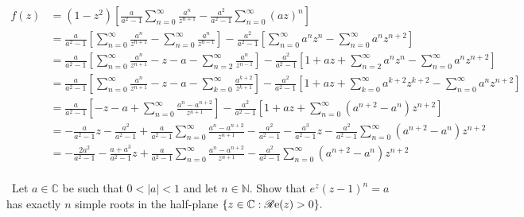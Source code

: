 \documentclass[12pt]{Qual}
\begin{document}
\begin{solution}
\begin{align*}
    f(z)&=(1-z^2)\left[\frac{a}{a^2-1}\sum_{n=0}^\infty\frac{a^n}{z^{n+1}}-\frac{a^2}{a^2-1}\sum_{n=0}^\infty(az)^n\right]\\
    &=\frac{a}{a^2-1}\left[\sum_{n=0}^\infty\frac{a^n}{z^{n+1}}-\sum_{n=0}^\infty\frac{a^n}{z^{n-1}}\right]-\frac{a^2}{a^2-1}\left[\sum_{n=0}^\infty a^nz^n-\sum_{n=0}^\infty a^nz^{n+2}\right]\\
    &=\frac{a}{a^2-1}\left[\sum_{n=0}^\infty\frac{a^n}{z^{n+1}}-z-a-\sum_{n=2}^\infty\frac{a^n}{z^{n-1}}\right]-\frac{a^2}{a^2-1}\left[1+az+\sum_{n=2}^\infty a^nz^n-\sum_{n=0}^\infty a^nz^{n+2}\right]\\
    &=\frac{a}{a^2-1}\left[\sum_{n=0}^\infty\frac{a^n}{z^{n+1}}-z-a-\sum_{k=0}^\infty\frac{a^{k+2}}{z^{k+1}}\right]-\frac{a^2}{a^2-1}\left[1+az+\sum_{k=0}^\infty a^{k+2}z^{k+2}-\sum_{n=0}^\infty a^nz^{n+2}\right]\\
    &=\frac{a}{a^2-1}\left[-z-a+\sum_{n=0}^\infty\frac{a^n-a^{n+2}}{z^{n+1}}\right]-\frac{a^2}{a^2-1}\left[1+az+\sum_{n=0}^\infty (a^{n+2}-a^n)z^{n+2}\right]\\
    &=-\frac{a}{a^2-1}z-\frac{a^2}{a^2-1}+\frac{a}{a^2-1}\sum_{n=0}^\infty\frac{a^n-a^{n+2}}{z^{n+1}}-\frac{a^2}{a^2-1}-\frac{a^3}{a^2-1}z-\frac{a^2}{a^2-1}\sum_{n=0}^\infty (a^{n+2}-a^n)z^{n+2}\\
    &=-\frac{2a^2}{a^2-1}-\frac{a+a^3}{a^2-1}z+\frac{a}{a^2-1}\sum_{n=0}^\infty\frac{a^n-a^{n+2}}{z^{n+1}}-\frac{a^2}{a^2-1}\sum_{n=0}^\infty (a^{n+2}-a^n)z^{n+2}\\
\end{align*}
\end{solution}
\newpage



\begin{problem} $\,$
Let $a\in\mathbb{C}$ be such that $0<|a|<1$ and let $n\in\mathbb{N}$. Show that $e^z(z-1)^n=a$ has exactly $n$ simple roots in the half-plane $\{z\in\mathbb{C}:\mathscr{R}\text{e}(z)>0\}.$
\end{problem}
\end{document}
